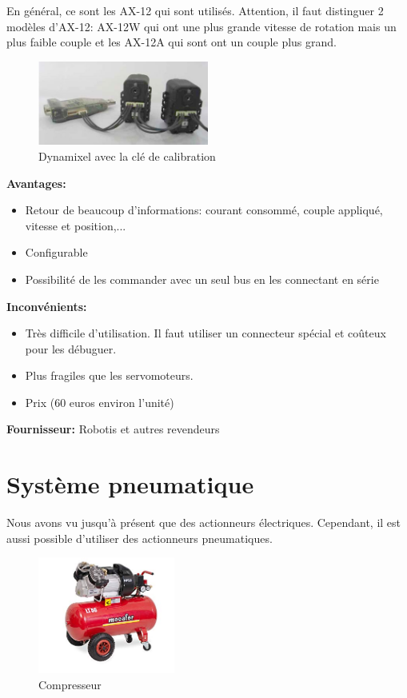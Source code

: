 \documentclass[a4paper, 11pt]{report}
\begin{document}
En général, ce sont les AX-12 qui sont utilisés. Attention, il faut distinguer 2 modèles d'AX-12: AX-12W qui ont une plus grande vitesse de rotation mais un plus faible couple et les AX-12A qui sont ont un couple plus grand.

\begin{figure}[h!]
\begin{centering}
\includegraphics[width=0.5\textwidth]{images/dynamixel.jpg}
\caption{Dynamixel avec la clé de calibration}
\par\end{centering}
\end{figure}

\textbf{Avantages:}
\begin{itemize}
\item Retour de beaucoup d'informations: courant consommé, couple appliqué, vitesse et position,...
\item Configurable
\item Possibilité de les commander avec un seul bus en les connectant en série
\end{itemize}

\textbf{Inconvénients:}
\begin{itemize}
\item Très difficile d'utilisation. Il faut utiliser un connecteur spécial et coûteux pour les débuguer.
\item Plus fragiles que les servomoteurs.
\item Prix (60 euros environ l'unité)
\end{itemize} 

\textbf{Fournisseur:} Robotis et autres revendeurs

\chapter{Système pneumatique}
Nous avons vu jusqu'à présent que des actionneurs électriques. Cependant, il est aussi possible d'utiliser des actionneurs pneumatiques.

\begin{figure}
\begin{centering}
\includegraphics[width=0.4\textwidth]{images/compresseur.jpg}
\caption{Compresseur}
\par\end{centering}
\end{figure}
\end{document}
